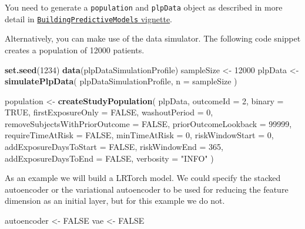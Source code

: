 \documentclass[
]{article}
\newenvironment{Shaded}{\begin{snugshade}}{\end{snugshade}}
\newcommand{\DataTypeTok}[1]{\textcolor[rgb]{0.13,0.29,0.53}{#1}}
\newcommand{\DecValTok}[1]{\textcolor[rgb]{0.00,0.00,0.81}{#1}}
\newcommand{\KeywordTok}[1]{\textcolor[rgb]{0.13,0.29,0.53}{\textbf{#1}}}
\newcommand{\NormalTok}[1]{#1}
\newcommand{\OtherTok}[1]{\textcolor[rgb]{0.56,0.35,0.01}{#1}}
\newcommand{\StringTok}[1]{\textcolor[rgb]{0.31,0.60,0.02}{#1}}
\begin{document}
You need to generate a \texttt{population} and \texttt{plpData} object
as described in more detail in
\href{https://github.com/OHDSI/PatientLevelPrediction/blob/master/inst/doc/BuildingPredictiveModels.pdf}{\texttt{BuildingPredictiveModels}
vignette}.

Alternatively, you can make use of the data simulator. The following
code snippet creates a population of 12000 patients.

\begin{Shaded}
\begin{Highlighting}[]
\KeywordTok{set.seed}\NormalTok{(}\DecValTok{1234}\NormalTok{)}
\KeywordTok{data}\NormalTok{(plpDataSimulationProfile)}
\NormalTok{sampleSize <-}\StringTok{ }\DecValTok{12000}
\NormalTok{plpData <-}\StringTok{ }\KeywordTok{simulatePlpData}\NormalTok{(}
\NormalTok{  plpDataSimulationProfile,}
  \DataTypeTok{n =}\NormalTok{ sampleSize}
\NormalTok{)}

\NormalTok{population <-}\StringTok{ }\KeywordTok{createStudyPopulation}\NormalTok{(}
\NormalTok{  plpData,}
  \DataTypeTok{outcomeId =} \DecValTok{2}\NormalTok{,}
  \DataTypeTok{binary =} \OtherTok{TRUE}\NormalTok{,}
  \DataTypeTok{firstExposureOnly =} \OtherTok{FALSE}\NormalTok{,}
  \DataTypeTok{washoutPeriod =} \DecValTok{0}\NormalTok{,}
  \DataTypeTok{removeSubjectsWithPriorOutcome =} \OtherTok{FALSE}\NormalTok{,}
  \DataTypeTok{priorOutcomeLookback =} \DecValTok{99999}\NormalTok{,}
  \DataTypeTok{requireTimeAtRisk =} \OtherTok{FALSE}\NormalTok{,}
  \DataTypeTok{minTimeAtRisk =} \DecValTok{0}\NormalTok{,}
  \DataTypeTok{riskWindowStart =} \DecValTok{0}\NormalTok{,}
  \DataTypeTok{addExposureDaysToStart =} \OtherTok{FALSE}\NormalTok{,}
  \DataTypeTok{riskWindowEnd =} \DecValTok{365}\NormalTok{,}
  \DataTypeTok{addExposureDaysToEnd =} \OtherTok{FALSE}\NormalTok{,}
  \DataTypeTok{verbosity =} \StringTok{"INFO"}
\NormalTok{)}
\end{Highlighting}
\end{Shaded}

As an example we will build a LRTorch model. We could specify the
stacked autoencoder or the variational autoencoder to be used for
reducing the feature dimension as an initial layer, but for this example
we do not.

\begin{Shaded}
\begin{Highlighting}[]
\NormalTok{autoencoder <-}\StringTok{ }\OtherTok{FALSE}
\NormalTok{vae <-}\StringTok{ }\OtherTok{FALSE}
\end{Highlighting}
\end{Shaded}
\end{document}
